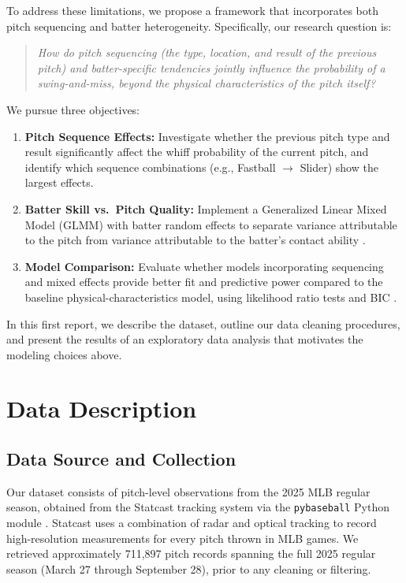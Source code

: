 \documentclass[11pt]{article}
\newcommand{\totalRaw}{711{,}897}        %
\begin{document}
To address these limitations, we propose a framework that incorporates both pitch sequencing and batter heterogeneity.
Specifically, our research question is:

\begin{quote}
\centering
\textit{How do pitch sequencing (the type, location, and result of the previous pitch) and batter-specific tendencies jointly influence the probability of a swing-and-miss, beyond the physical characteristics of the pitch itself?}
\end{quote}

\noindent
We pursue three objectives:
\begin{enumerate}[leftmargin=3em, label=\textbf{\arabic*.}]
    \item \textbf{Pitch Sequence Effects:} Investigate whether the previous pitch type and result significantly affect the whiff probability of the current pitch, and identify which sequence combinations (e.g., Fastball $\rightarrow$ Slider) show the largest effects.
    \item \textbf{Batter Skill vs.\ Pitch Quality:} Implement a Generalized Linear Mixed Model (GLMM) with batter random effects to separate variance attributable to the pitch from variance attributable to the batter's contact ability \citep{gelman2006data, bolker2009glmm}.
    \item \textbf{Model Comparison:} Evaluate whether models incorporating sequencing and mixed effects provide better fit and predictive power compared to the baseline physical-characteristics model, using likelihood ratio tests and BIC \citep{mccullagh2019generalized}.
\end{enumerate}

In this first report, we describe the dataset, outline our data cleaning procedures, and present the results of an exploratory data analysis that motivates the modeling choices above.

\section{Data Description}

\subsection{Data Source and Collection}

Our dataset consists of pitch-level observations from the 2025 MLB regular season, obtained from the Statcast tracking system via the \texttt{pybaseball} Python module \citep{pybaseball}.
Statcast uses a combination of radar and optical tracking to record high-resolution measurements for every pitch thrown in MLB games.
We retrieved approximately \totalRaw{} pitch records spanning the full 2025 regular season (March 27 through September 28), prior to any cleaning or filtering.
\end{document}
